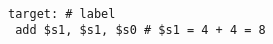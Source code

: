 \documentclass[../main.tex]{subfiles}
\begin{document}
\\
\texttt{target: \hspace*{0cm} \hspace*{0cm} \hspace*{0cm} \hspace*{0cm} \hspace*{0cm} \hspace*{0cm} \hspace*{0cm} \hspace*{0cm} \hspace*{0cm} \hspace*{0cm} \hspace*{0cm} \hspace*{0cm} \hspace*{0cm} \# label} \\
\texttt{\hspace*{0cm} \hspace*{0cm} add \$s1, \$s1, \$s0 \hspace*{0cm} \hspace*{0cm} \# \$s1 = 4 + 4 = 8}

\vspace*{2mm}
\end{document}
